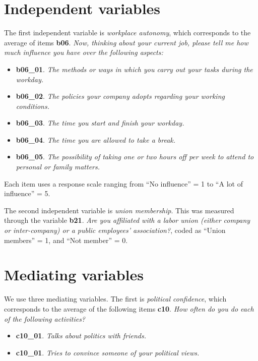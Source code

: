 \documentclass[
  letterpaper,
  DIV=11,
  numbers=noendperiod]{scrreprt}
\providecommand{\tightlist}{%
  \setlength{\itemsep}{0pt}\setlength{\parskip}{0pt}}\usepackage{longtable,booktabs,array}
\begin{document}
\hypertarget{independent-variables}{%
\section{Independent variables}\label{independent-variables}}

The first independent variable is \emph{workplace autonomy}, which
corresponds to the average of items \textbf{b06}. \emph{Now, thinking
about your current job, please tell me how much influence you have over
the following aspects:}

\begin{itemize}
\tightlist
\item
  \textbf{b06\_01}. \emph{The methods or ways in which you carry out
  your tasks during the workday.}
\item
  \textbf{b06\_02}. \emph{The policies your company adopts regarding
  your working conditions.}
\item
  \textbf{b06\_03}. \emph{The time you start and finish your workday.}
\item
  \textbf{b06\_04}. \emph{The time you are allowed to take a break.}
\item
  \textbf{b06\_05}. \emph{The possibility of taking one or two hours off
  per week to attend to personal or family matters.}
\end{itemize}

Each item uses a response scale ranging from ``No influence'' = 1 to ``A
lot of influence'' = 5.

The second independent variable is \emph{union membership}. This was
measured through the variable \textbf{b21}. \emph{Are you affiliated
with a labor union (either company or inter-company) or a public
employees' association?}, coded as ``Union members'' = 1, and ``Not
member'' = 0.

\hypertarget{mediating-variables}{%
\section{Mediating variables}\label{mediating-variables}}

We use three mediating variables. The first is \emph{political
confidence}, which corresponds to the average of the following items
\textbf{c10}. \emph{How often do you do each of the following
activities?}

\begin{itemize}
\tightlist
\item
  \textbf{c10\_01}. \emph{Talks about politics with friends.}
\item
  \textbf{c10\_01}. \emph{Tries to convince someone of your political
  views.}
\end{itemize}
\end{document}
